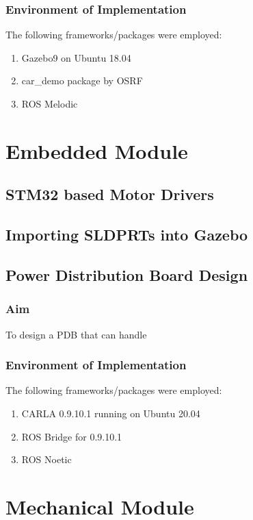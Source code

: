 \documentclass[a4paper,12pt]{report}
\begin{document}
\subsection{Environment of Implementation}

The following frameworks/packages were employed:
\begin{enumerate}
	\item Gazebo9 on Ubuntu 18.04
	\item car\_demo package by OSRF
	\item ROS Melodic
\end{enumerate}

\chapter{Embedded Module}
\section{STM32 based Motor Drivers}

\section{Importing SLDPRTs into Gazebo}

\section{Power Distribution Board Design}
\subsection{Aim}
To design a PDB that can handle 

\subsection{Environment of Implementation}

The following frameworks/packages were employed:
\begin{enumerate}
	\item CARLA 0.9.10.1 running on Ubuntu 20.04
	\item ROS Bridge for 0.9.10.1
	\item ROS Noetic
\end{enumerate}

\chapter{Mechanical Module}
\end{document}
